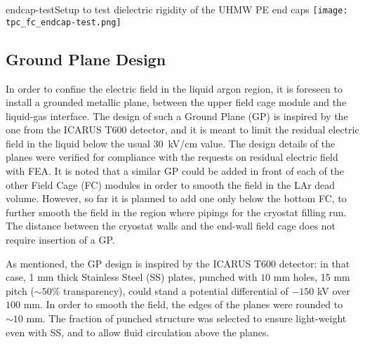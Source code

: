 \begin{cdrfigure}{endcap-test}{Setup to test dielectric rigidity of the UHMW PE end caps}
\texttt{[image: tpc\_fc\_endcap-test.png]}
\end{cdrfigure}

\subsection{Ground Plane Design}

In order to confine the electric field in the liquid argon region, it is foreseen to install a grounded metallic plane,  between the upper field cage module and the liquid-gas interface. The design of such a Ground Plane (GP)  is inspired by the one from the ICARUS T600 detector, and it is meant to limit the residual electric field in the liquid below the usual 30~kV/cm value. 
The design details of the planes were verified for compliance with the requests on residual electric field with FEA.  It is noted that a similar GP could be added in front of each of the other Field Cage (FC) modules in order to smooth the field in the LAr dead volume. However, so far it is planned to add one only below the bottom FC, to further smooth the field in the region where pipings for the cryostat filling  run. The distance between the cryostat walls and the end-wall field cage does not require insertion of a GP.

As mentioned, the GP design is inspired by the ICARUS T600 detector: in that case, 1 mm thick Stainless Steel (SS) plates, punched with $10$ mm holes, 15 mm pitch ($\sim 50\%$ transparency), could stand a potential differential of $-150$ kV over $100$ mm. In order to smooth the field, the edges of the planes were rounded to $\sim 10$ mm. The fraction of punched structure was selected to ensure light-weight even with SS, and to allow fluid circulation above the planes.

